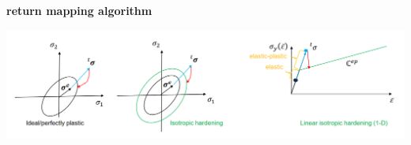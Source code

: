 \documentclass[landscape,a0paper,fontscale=0.285]{baposter} %
\begin{document}
\begin{poster}
{\textbf{return mapping algorithm}

\includegraphics[width=\textwidth]{figures/ETHz_AFEA_FEM_Elasto_Plastic_return_mapping.png}


}




\end{poster}
\newpage

\end{document}
